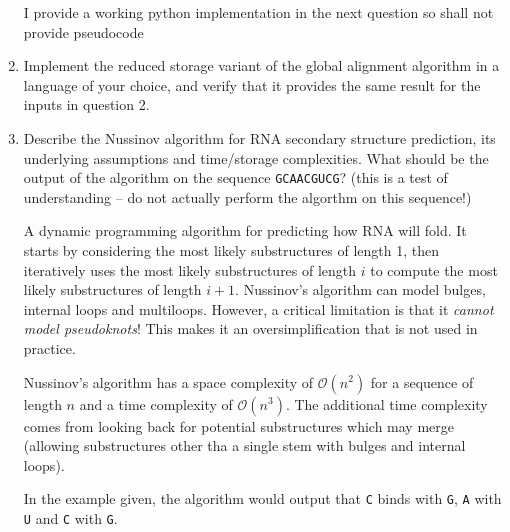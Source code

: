 \documentclass[10pt,\jkfside,a4paper]{article}
\begin{document}
\begin{enumerate}
    I provide a working python implementation in the next question so shall not provide pseudocode

    \item Implement the reduced storage variant of the global alignment algorithm in a language of your choice, and verify that it provides the same result for the inputs in question 2.

    

    \item Describe the Nussinov algorithm for RNA secondary structure prediction, its underlying assumptions and time/storage complexities. What should be the output of the algorithm on the sequence
    \texttt{GCAACGUCG}? (this is a test of understanding -- do not actually perform the algorthm on this sequence!)

    \begin{definition}

        A dynamic programming algorithm for predicting how RNA will fold. It starts by considering the most likely substructures of length 1, then iteratively uses the most likely substructures of length $i$ to
        compute the most likely substructures of length $i + 1$. Nussinov's algorithm can model bulges, internal loops and multiloops. However, a critical limitation is that it \textit{cannot model pseudoknots}!
        This makes it an oversimplification that is not used in practice.

    \end{definition}

    Nussinov's algorithm has a space complexity of $\mathcal O(n^2)$ for a sequence of length $n$ and a time complexity of $\mathcal O(n^3)$. The additional time complexity comes from looking back for potential
    substructures which may merge (\ie allowing substructures other tha a single stem with bulges and internal loops).

    In the example given, the algorithm would output that \texttt{C} binds with \texttt{G}, \texttt{A} with \texttt{U} and \texttt{C} with \texttt{G}.

    \begin{figure}[H]

        \centering

\end{figure}
\end{enumerate}
\end{document}
